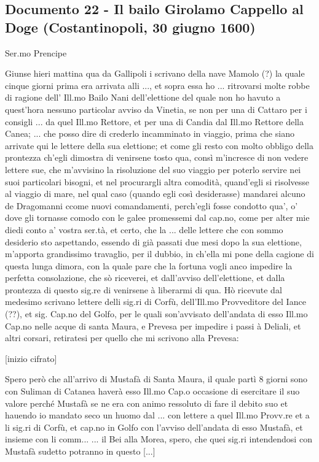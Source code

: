 \subsection{Documento 22 - Il bailo Girolamo Cappello al Doge (Costantinopoli, 30 giugno 1600)}

\begin{center}
Ser.mo Prencipe
\end{center}

Giunse hieri mattina qua da Gallipoli i scrivano della nave Mamolo (?)
la quale cinque  giorni prima era arrivata alli ...,  et sopra essa ho
...   ritrovarsi  molte  robbe  di  ragione dell'  Ill.mo  Bailo  Nani
dell'elettione del quale non ho havuto a quest'hora nessuno particolar
avviso da  Vinetia, se non  per una di  Cattaro per i consigli  ... da
quel Ill.mo  Rettore, et  per una di  Candia dal Ill.mo  Rettore della
Canea; ...  che  posso dire di crederlo incamminato  in viaggio, prima
che siano  arrivate qui  le lettere della  sua elettione; et  come gli
resto con molto obbligo  della prontezza ch'egli dimostra di venirsene
tosto qua, consì m'incresce di  non vedere lettere sue, che m'avvisino
la  risoluzione   del  suo  viaggio  per  poterlo   servire  nei  suoi
particolari bisogni, et nel  procurargli altra comodità, quand'egli si
risolvesse  al  viaggio di  mare,  nel  qual  caso (quando  egli  così
desiderasse) mandarei  alcuno de Dragomanni  ccome nuovi comandamenti,
perch'egli fosse  condotto qua',  o' dove gli  tornasse comodo  con le
galee promessemi dal cap.no, come  per alter mie diedi conto a' vostra
ser.tà, et certo, che la ... delle lettere che con sommo desiderio sto
aspettando, essendo  di già  passati due mesi  dopo la  sua elettione,
m'apporta  grandissimo travaglio, per  il dubbio,  in ch'ella  mi pone
della cagione di questa lunga dimora, con la quale pare che la fortuna
vogli  anco impedire la  perfetta consolazione,  che sò  riceverei, et
dall'avviso  dell'elettione, et  dalla prontezza  di questo  sig.re di
venirsene  à  liberarmi di  qua.  Hò  ricevute  dal medesimo  scrivano
lettere  delli sig.ri  di  Corfù, dell'Ill.mo  Provveditore del  Iance
(??), et sig. Cap.no del  Golfo, per le quali son'avvisato dell'andata
di  esso Ill.mo  Cap.no  nelle acque  di  santa Maura,  e Prevesa  per
impedire i  passi à Deliali,  et altri corsari, retiratesi  per quello
che mi scrivono alla Prevesa:

[inizio cifrato]

Spero però che all'arrivo di Mustafà  di Santa Maura, il quale partì 8
giorni sono con Suliman di  Catanea haverà esso Ill.mo Cap.o occasione
di  esercitare  il suo  valore  perché Mustafà  se  ne  era con  animo
ressoluto di  fare il debito suo  et hauendo io mandato  seco un huomo
dal ... con lettere a quel Ill.mo Provv.re et a li sig.ri di Corfù, et
cap.no in Golfo  con l'avviso dell'andata di esso  Mustafà, et insieme
con  li  comm...  ...   il  Bei alla  Morea,  spero,  che quei  sig.ri
intendendosi con Mustafà sudetto potranno in questo [...]

